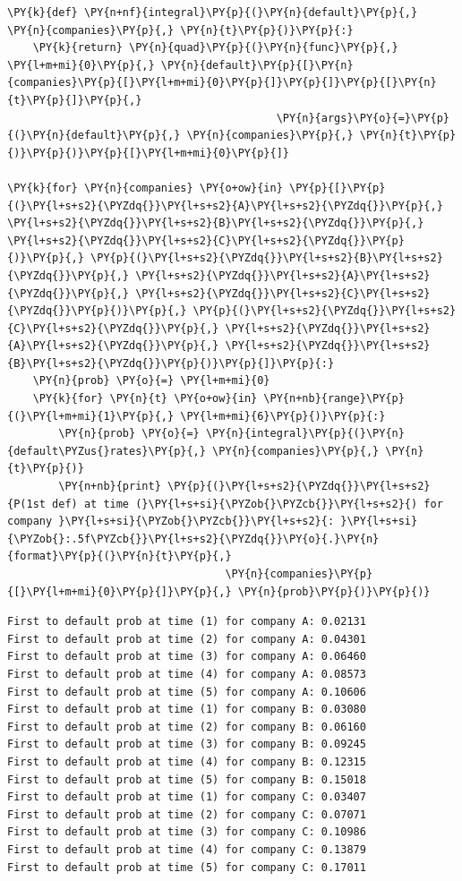 \begin{tcolorbox}[breakable, size=fbox, boxrule=1pt, pad at break*=1mm,colback=cellbackground, colframe=cellborder]
\begin{Verbatim}[commandchars=\\\{\}]
\PY{k}{def} \PY{n+nf}{integral}\PY{p}{(}\PY{n}{default}\PY{p}{,} \PY{n}{companies}\PY{p}{,} \PY{n}{t}\PY{p}{)}\PY{p}{:}
    \PY{k}{return} \PY{n}{quad}\PY{p}{(}\PY{n}{func}\PY{p}{,} \PY{l+m+mi}{0}\PY{p}{,} \PY{n}{default}\PY{p}{[}\PY{n}{companies}\PY{p}{[}\PY{l+m+mi}{0}\PY{p}{]}\PY{p}{]}\PY{p}{[}\PY{n}{t}\PY{p}{]}\PY{p}{,} 
                                          \PY{n}{args}\PY{o}{=}\PY{p}{(}\PY{n}{default}\PY{p}{,} \PY{n}{companies}\PY{p}{,} \PY{n}{t}\PY{p}{)}\PY{p}{)}\PY{p}{[}\PY{l+m+mi}{0}\PY{p}{]}
                 
\PY{k}{for} \PY{n}{companies} \PY{o+ow}{in} \PY{p}{[}\PY{p}{(}\PY{l+s+s2}{\PYZdq{}}\PY{l+s+s2}{A}\PY{l+s+s2}{\PYZdq{}}\PY{p}{,} \PY{l+s+s2}{\PYZdq{}}\PY{l+s+s2}{B}\PY{l+s+s2}{\PYZdq{}}\PY{p}{,} \PY{l+s+s2}{\PYZdq{}}\PY{l+s+s2}{C}\PY{l+s+s2}{\PYZdq{}}\PY{p}{)}\PY{p}{,} \PY{p}{(}\PY{l+s+s2}{\PYZdq{}}\PY{l+s+s2}{B}\PY{l+s+s2}{\PYZdq{}}\PY{p}{,} \PY{l+s+s2}{\PYZdq{}}\PY{l+s+s2}{A}\PY{l+s+s2}{\PYZdq{}}\PY{p}{,} \PY{l+s+s2}{\PYZdq{}}\PY{l+s+s2}{C}\PY{l+s+s2}{\PYZdq{}}\PY{p}{)}\PY{p}{,} \PY{p}{(}\PY{l+s+s2}{\PYZdq{}}\PY{l+s+s2}{C}\PY{l+s+s2}{\PYZdq{}}\PY{p}{,} \PY{l+s+s2}{\PYZdq{}}\PY{l+s+s2}{A}\PY{l+s+s2}{\PYZdq{}}\PY{p}{,} \PY{l+s+s2}{\PYZdq{}}\PY{l+s+s2}{B}\PY{l+s+s2}{\PYZdq{}}\PY{p}{)}\PY{p}{]}\PY{p}{:}
    \PY{n}{prob} \PY{o}{=} \PY{l+m+mi}{0}
    \PY{k}{for} \PY{n}{t} \PY{o+ow}{in} \PY{n+nb}{range}\PY{p}{(}\PY{l+m+mi}{1}\PY{p}{,} \PY{l+m+mi}{6}\PY{p}{)}\PY{p}{:}
        \PY{n}{prob} \PY{o}{=} \PY{n}{integral}\PY{p}{(}\PY{n}{default\PYZus{}rates}\PY{p}{,} \PY{n}{companies}\PY{p}{,} \PY{n}{t}\PY{p}{)}
        \PY{n+nb}{print} \PY{p}{(}\PY{l+s+s2}{\PYZdq{}}\PY{l+s+s2}{P(1st def) at time (}\PY{l+s+si}{\PYZob{}\PYZcb{}}\PY{l+s+s2}{) for company }\PY{l+s+si}{\PYZob{}\PYZcb{}}\PY{l+s+s2}{: }\PY{l+s+si}{\PYZob{}:.5f\PYZcb{}}\PY{l+s+s2}{\PYZdq{}}\PY{o}{.}\PY{n}{format}\PY{p}{(}\PY{n}{t}\PY{p}{,} 
              					  \PY{n}{companies}\PY{p}{[}\PY{l+m+mi}{0}\PY{p}{]}\PY{p}{,} \PY{n}{prob}\PY{p}{)}\PY{p}{)}
\end{Verbatim}
\end{tcolorbox}

    \begin{Verbatim}[commandchars=\\\{\}]
First to default prob at time (1) for company A: 0.02131
First to default prob at time (2) for company A: 0.04301
First to default prob at time (3) for company A: 0.06460
First to default prob at time (4) for company A: 0.08573
First to default prob at time (5) for company A: 0.10606
First to default prob at time (1) for company B: 0.03080
First to default prob at time (2) for company B: 0.06160
First to default prob at time (3) for company B: 0.09245
First to default prob at time (4) for company B: 0.12315
First to default prob at time (5) for company B: 0.15018
First to default prob at time (1) for company C: 0.03407
First to default prob at time (2) for company C: 0.07071
First to default prob at time (3) for company C: 0.10986
First to default prob at time (4) for company C: 0.13879
First to default prob at time (5) for company C: 0.17011
    \end{Verbatim}

